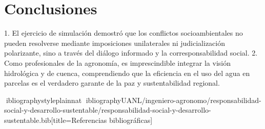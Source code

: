 \documentclass[spanish,letterpaper,oneside]{article}
\begin{document}
\section{Conclusiones}
1. El ejercicio de simulación demostró que los conflictos socioambientales no pueden resolverse mediante imposiciones unilaterales ni judicialización polarizante, sino a través del diálogo informado y la corresponsabilidad social.
2. Como profesionales de la agronomía, es imprescindible integrar la visión hidrológica y de cuenca, comprendiendo que la eficiencia en el uso del agua en parcelas es el verdadero garante de la paz y sustentabilidad regional.

\newpage
ibliographystyle{plainnat}
ibliography{UANL/ingeniero-agronomo/responsabilidad-social-y-desarrollo-sustentable/responsabilidad-social-y-desarrollo-sustentable.bib}[title={Referencias bibliográficas}]
\end{document}
